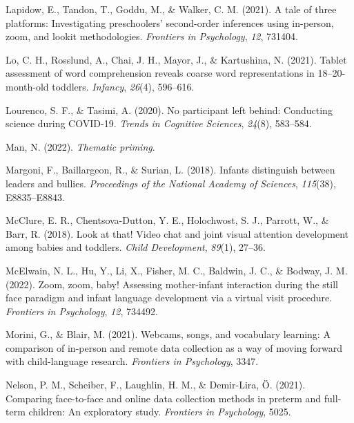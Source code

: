 \documentclass[
  man,floatsintext]{apa6}
\newlength{\cslhangindent}
\newlength{\cslentryspacingunit} %
\newenvironment{CSLReferences}[2] %
 {%
  \setlength{\parindent}{0pt}
  \ifodd #1
  \let\oldpar\par
  \def\par{\hangindent=\cslhangindent\oldpar}
  \fi
  \setlength{\parskip}{#2\cslentryspacingunit}
 }%
 {}
\begin{document}
\begin{CSLReferences}{1}{0}
\leavevmode{}%
Lapidow, E., Tandon, T., Goddu, M., \& Walker, C. M. (2021). A tale of three platforms: Investigating preschoolers' second-order inferences using in-person, zoom, and lookit methodologies. \emph{Frontiers in Psychology}, \emph{12}, 731404.

\leavevmode{}%
Lo, C. H., Rosslund, A., Chai, J. H., Mayor, J., \& Kartushina, N. (2021). Tablet assessment of word comprehension reveals coarse word representations in 18--20-month-old toddlers. \emph{Infancy}, \emph{26}(4), 596--616.

\leavevmode{}%
Lourenco, S. F., \& Tasimi, A. (2020). No participant left behind: Conducting science during COVID-19. \emph{Trends in Cognitive Sciences}, \emph{24}(8), 583--584.

\leavevmode{}%
Man, N. (2022). \emph{Thematic priming}.

\leavevmode{}%
Margoni, F., Baillargeon, R., \& Surian, L. (2018). Infants distinguish between leaders and bullies. \emph{Proceedings of the National Academy of Sciences}, \emph{115}(38), E8835--E8843.

\leavevmode{}%
McClure, E. R., Chentsova-Dutton, Y. E., Holochwost, S. J., Parrott, W., \& Barr, R. (2018). Look at that! Video chat and joint visual attention development among babies and toddlers. \emph{Child Development}, \emph{89}(1), 27--36.

\leavevmode{}%
McElwain, N. L., Hu, Y., Li, X., Fisher, M. C., Baldwin, J. C., \& Bodway, J. M. (2022). Zoom, zoom, baby! Assessing mother-infant interaction during the still face paradigm and infant language development via a virtual visit procedure. \emph{Frontiers in Psychology}, \emph{12}, 734492.

\leavevmode{}%
Morini, G., \& Blair, M. (2021). Webcams, songs, and vocabulary learning: A comparison of in-person and remote data collection as a way of moving forward with child-language research. \emph{Frontiers in Psychology}, 3347.

\leavevmode{}%
Nelson, P. M., Scheiber, F., Laughlin, H. M., \& Demir-Lira, Ö. (2021). Comparing face-to-face and online data collection methods in preterm and full-term children: An exploratory study. \emph{Frontiers in Psychology}, 5025.


\end{CSLReferences}
\end{document}
